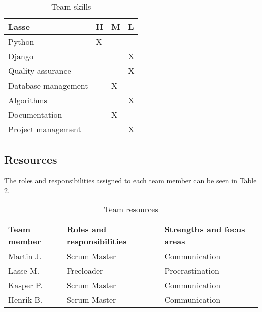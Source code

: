\begin{table}[!ht]
{        \centering
        \small
        \begin{tabular}{l|l|l|l}
            \rowcolor{Gray}
            \textbf{Lasse} & \textbf{H} & \textbf{M} & \textbf{L}\\\hline
             Python & X & &\\
             Django & & & X\\
             Quality assurance & & & X\\
             Database management & & X &\\
             Algorithms & & & X\\
             Documentation & & X &\\
             Project management & & & X
        \end{tabular}
        }%
    \caption{Team skills}
    \label{tab:skills}
\end{table}

\subsection{Resources}
The roles and responsibilities assigned to each team member can be seen in Table \ref{tab:resources}.


\begin{table}[!ht]
    \centering
    \begin{tabular}{l|l|l}
        \rowcolor{Gray}
        \textbf{Team member} & \textbf{Roles and responsibilities} & \textbf{Strengths and focus areas}\\\hline
        Martin J.            &Scrum Master & Communication\\
        Lasse M.             &Freeloader & Procrastination\\
        Kasper P.            &Scrum Master & Communication\\
        Henrik B.            &Scrum Master & Communication\\
    \end{tabular}
    \caption{Team resources}
    \label{tab:resources}
\end{table}

